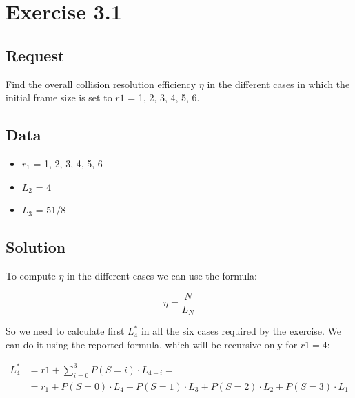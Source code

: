 \section{Exercise 3.1}
\subsection{Request}
Find the overall collision resolution efficiency $\eta$ in the different cases in which the initial frame size is set to $r1$ = 1, 2, 3, 4, 5, 6.
\subsection{Data}
\begin{itemize}
\item $r_1$ = 1, 2, 3, 4, 5, 6
\item $L_2$ = 4
\item $L_3$ = 51/8
\end{itemize}
\subsection{Solution}
To compute $\eta$ in the different cases we can use the formula:

\begin{equation}
\eta = \frac{N} {L_N}
\end{equation}

So we need to calculate first $L_4^*$ in all the six cases required by the exercise. We can do it using the reported formula, which will be recursive only for $r1 = 4$:

\begin{equation}
\begin{split}
L_4^* &= r1 + \sum_{i=0}^{3} P(S=i) \cdot L_{4-i} = \\
& = r_1 + P(S=0) \cdot L_4 + P(S=1) \cdot L_3 + P(S=2) \cdot L_2 + P(S=3) \cdot L_1
\end{split}
\end{equation}

